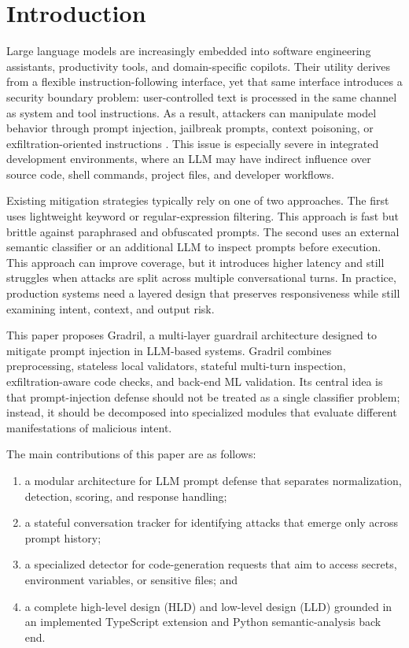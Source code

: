 \documentclass[journal]{IEEEtran}
\begin{document}
\section{Introduction}
Large language models are increasingly embedded into software engineering assistants, productivity tools, and domain-specific copilots. Their utility derives from a flexible instruction-following interface, yet that same interface introduces a security boundary problem: user-controlled text is processed in the same channel as system and tool instructions. As a result, attackers can manipulate model behavior through prompt injection, jailbreak prompts, context poisoning, or exfiltration-oriented instructions \cite{owasp_llm_top10,greshake2023more}. This issue is especially severe in integrated development environments, where an LLM may have indirect influence over source code, shell commands, project files, and developer workflows.

Existing mitigation strategies typically rely on one of two approaches. The first uses lightweight keyword or regular-expression filtering. This approach is fast but brittle against paraphrased and obfuscated prompts. The second uses an external semantic classifier or an additional LLM to inspect prompts before execution. This approach can improve coverage, but it introduces higher latency and still struggles when attacks are split across multiple conversational turns. In practice, production systems need a layered design that preserves responsiveness while still examining intent, context, and output risk.

This paper proposes Gradril, a multi-layer guardrail architecture designed to mitigate prompt injection in LLM-based systems. Gradril combines preprocessing, stateless local validators, stateful multi-turn inspection, exfiltration-aware code checks, and back-end ML validation. Its central idea is that prompt-injection defense should not be treated as a single classifier problem; instead, it should be decomposed into specialized modules that evaluate different manifestations of malicious intent.

The main contributions of this paper are as follows:
\begin{enumerate}
    \item a modular architecture for LLM prompt defense that separates normalization, detection, scoring, and response handling;
    \item a stateful conversation tracker for identifying attacks that emerge only across prompt history;
    \item a specialized detector for code-generation requests that aim to access secrets, environment variables, or sensitive files; and
    \item a complete high-level design (HLD) and low-level design (LLD) grounded in an implemented TypeScript extension and Python semantic-analysis back end.
\end{enumerate}
\end{document}
